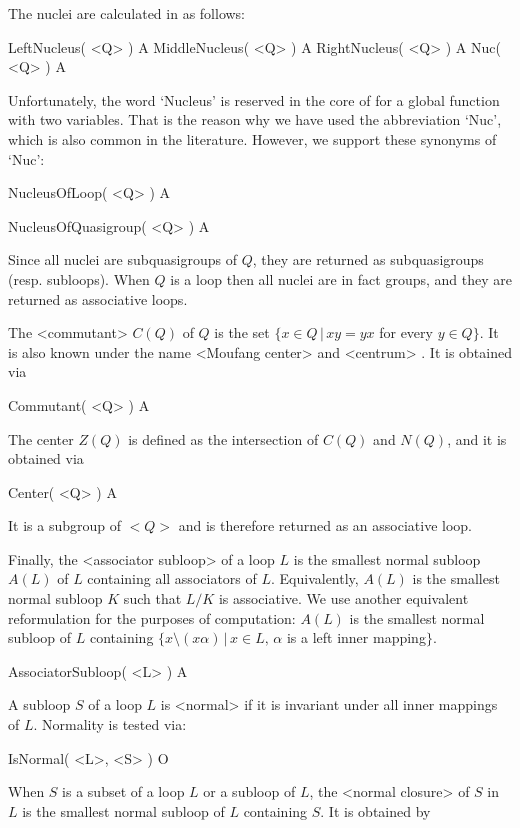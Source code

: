 The nuclei are calculated in {\LOOPS} as follows:

\>LeftNucleus( <Q> ) A
\>MiddleNucleus( <Q> ) A
\>RightNucleus( <Q> ) A
\>Nuc( <Q> ) A

Unfortunately, the word `Nucleus' is reserved in the core of {\GAP} for a
global function with two variables. That is the reason why we have used the
abbreviation `Nuc', which is also common in the literature. However, we support
these synonyms of `Nuc':

\>NucleusOfLoop( <Q> ) A

\>NucleusOfQuasigroup( <Q> ) A

Since all nuclei are subquasigroups of $Q$, they are returned as subquasigroups
(resp. subloops). When $Q$ is a loop then all nuclei are in fact groups, and
they are returned as associative loops.

The <commutant>
%
%
 $C(Q)$ of $Q$ is the set $\{x\in Q\,|\,xy=yx$
for every $y\in Q\}$. It is also known under the name <Moufang center>
%
%
and <centrum>
%
%
. It is obtained via

\>Commutant( <Q> ) A

The center $Z(Q)$ is defined as the intersection of $C(Q)$ and $N(Q)$, and it
is obtained via

\>Center( <Q> ) A

It is a subgroup of $<Q>$ and is therefore returned as an associative loop.

Finally, the <associator subloop>
%
%
of a loop $L$ is the smallest normal subloop $A(L)$ of $L$
containing all associators of $L$. Equivalently, $A(L)$ is the
smallest normal subloop $K$ such that $L/K$ is associative. We use
another equivalent reformulation for the purposes of computation:
$A(L)$ is the smallest normal subloop of $L$ containing
$\{x\setminus(x\alpha)\,|\,x\in L,\,\alpha$ is a left inner
mapping$\}$.

\>AssociatorSubloop( <L> )  A


A subloop $S$ of a loop $L$ is <normal> if it is
invariant under all inner mappings of $L$. Normality is tested via:

\>IsNormal( <L>, <S> ) O

When $S$ is a subset of a loop $L$ or a subloop of $L$, the <normal closure>
%
%
 of $S$ in $L$ is the smallest normal subloop of $L$ containing $S$. It
is obtained by

